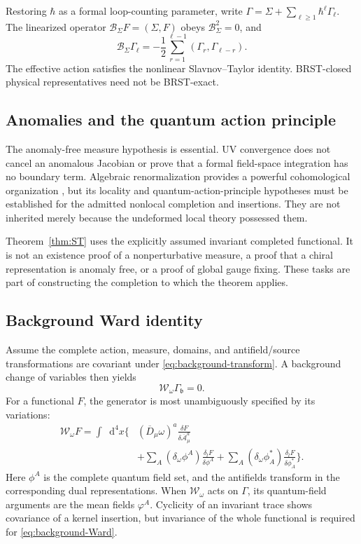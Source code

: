 \documentclass[final,5p,times,twocolumn,numbers,nopreprintline]{elsarticle}
\numberwithin{equation}{section}
\theoremstyle{definition}
\theoremstyle{remark}
\newcommand{\dd}{\mathop{}\!\mathrm d}
\newcommand{\bb}{\mathfrak b}
\begin{document}
Restoring \(\hbar\) as a formal loop-counting parameter, write
\(\Gamma=\Sigma+\sum_{\ell\geq1}\hbar^\ell\Gamma_\ell\).
The linearized operator
\(\mathcal B_\Sigma F=(\Sigma,F)\) obeys
\(\mathcal B_\Sigma^2=0\), and
\begin{equation}
 \mathcal B_\Sigma\Gamma_\ell
 =-\frac12\sum_{r=1}^{\ell-1}
                 (\Gamma_r,\Gamma_{\ell-r}).
 \label{eq:loop-ST}
\end{equation}
The effective action satisfies the nonlinear Slavnov--Taylor identity.
BRST-closed physical representatives need not be BRST-exact.

\subsection{Anomalies and the quantum action principle}

The anomaly-free measure hypothesis is essential. UV convergence
does not cancel an anomalous Jacobian or prove that a formal
field-space integration has no boundary term. Algebraic
renormalization provides a powerful cohomological organization
\cite{PiguetSorella,Slavnov1972,Taylor1971,ZinnJustin1975},
but its locality and quantum-action-principle hypotheses must be
established for the admitted nonlocal completion and insertions.
They are not inherited merely because the undeformed local theory
possessed them.

Theorem~\ref{thm:ST} uses the explicitly assumed invariant
completed functional. It is not an existence proof of a
nonperturbative measure, a proof that a chiral representation is
anomaly free, or a proof of global gauge fixing. These tasks are
part of constructing the completion to which the theorem applies.

\subsection{Background Ward identity}

Assume the complete action, measure, domains, and antifield/source
transformations are covariant under
\eqref{eq:background-transform}. A background change of variables
then yields
\begin{equation}
 \mathcal W_\omega\Gamma_{\bb}=0.
 \label{eq:background-Ward}
\end{equation}
For a functional \(F\), the generator is most unambiguously
specified by its variations:
\begin{align}
 \mathcal W_\omega F
 =\int\dd^4x\bigg\{&
  (\overline D_\mu\omega)^a
      \frac{\delta F}{\delta\overline{\mathcal A}_\mu^a}
      \nonumber\\
 &+\sum_A(\delta_\omega\phi^A)
               \frac{\delta_lF}{\delta\phi^A}
  +\sum_A(\delta_\omega\phi_A^*)
               \frac{\delta_lF}{\delta\phi_A^*}\bigg\}.
 \label{eq:Ward-generator}
\end{align}
Here \(\phi^A\) is the complete quantum field set, and the
antifields transform in the corresponding dual representations.
When \(\mathcal W_\omega\) acts on \(\Gamma\), its quantum-field
arguments are the mean fields \(\varphi^A\).
Cyclicity of an invariant trace shows covariance of a kernel
insertion, but invariance of the whole functional is required for
\eqref{eq:background-Ward}.
\end{document}
